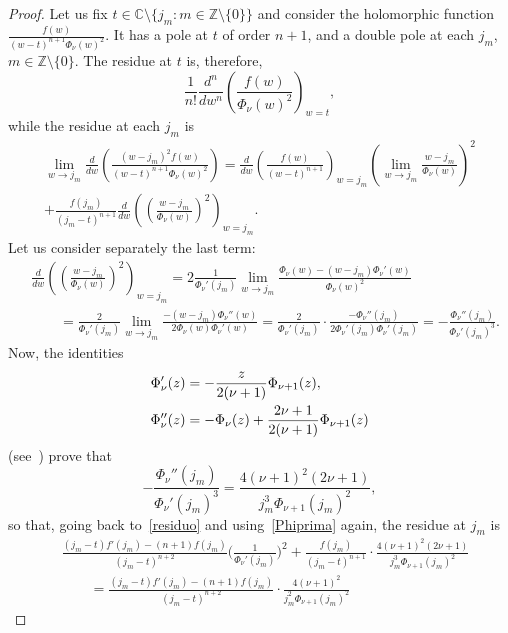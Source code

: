 \documentclass[10pt,leqno,a4paper]{article}
\theoremstyle{plain}
\newcommand{\ZZ}{\mathbb{Z}}
\newcommand{\CC}{\mathbb{C}}
\numberwithin{equation}{section}
\begin{document}
\begin{proof}
Let us fix $t \in \CC \setminus \{j_m : m \in \ZZ \setminus \{0\} \}$ and consider the holomorphic function $\frac{f(w)}{(w-t)^{n+1} \Phi_\nu(w)^2}$. It has a pole at $t$ of order $n+1$, and a double pole at each $j_m$, $m\in \ZZ \setminus \{0\}$. The residue at $t$ is, therefore,
\[
   \frac{1}{n!} \frac{d^n}{dw^n} \left( \frac{f(w)}{\Phi_\nu(w)^2} \right)_{w=t},
\]
while the residue at each $j_m$ is
\begin{multline}
\label{residuo}
   \lim_{w\to j_m} \frac{d}{dw} \left( \frac{(w-j_m)^2 f(w)}{(w-t)^{n+1} \Phi_\nu(w)^2} \right)
   = \frac{d}{dw} \left(\frac{f(w)}{(w-t)^{n+1}}\right)_{w=j_m}
   \left( \lim_{w\to j_m} \frac{w-j_m}{\Phi_\nu(w)} \right)^2
   \\
   + \frac{f(j_m)}{(j_m-t)^{n+1}} \frac{d}{dw} \left(
   \left(\frac{w-j_m}{\Phi_\nu(w)} \right)^2
   \right)_{w=j_m}.
\end{multline}
Let us consider separately the last term:
\begin{align*}
   &\frac{d}{dw}\left(
   \left(\frac{w-j_m}{\Phi_\nu(w)} \right)^2
   \right)_{w=j_m}
   = 2 \frac{1}{\Phi_\nu'(j_m)}
   \lim_{w \to j_m} \frac{\Phi_\nu(w) - (w-j_m) \Phi_\nu'(w)}{\Phi_\nu(w)^2}
   \\
   &\qquad = \frac{2}{\Phi_\nu'(j_m)}
   \lim_{w \to j_m} \frac{-(w-j_m) \Phi_\nu''(w)}{2 \Phi_\nu(w) \Phi_\nu'(w)}
   = \frac{2}{\Phi_\nu'(j_m)} \cdot \frac{-\Phi_\nu''(j_m)}{2\Phi_\nu'(j_m) \Phi_\nu'(j_m)}
   = -\frac{\Phi_\nu''(j_m)}{\Phi_\nu'(j_m)^3}.
\end{align*}
Now, the identities
\begin{align}
\label{Phiprima}
   \Phi_\nu'(z) &= -\frac{z}{2(\nu+1)} \Phi_{\nu+1}(z),
   \\
\notag
   \Phi_\nu''(z) &= - \Phi_\nu(z) + \frac{2\nu+1}{2(\nu+1)} \Phi_{\nu+1}(z)
\end{align}
(see~\cite[\S\,3.2, p.~45]{Wat}) prove that
\[
   -\frac{\Phi_\nu''(j_m)}{\Phi_\nu'(j_m)^3}
   = \frac{4 (\nu+1)^2 (2\nu+1)}{j_m^3 \Phi_{\nu+1}(j_m)^2},
\]
so that, going back to~\eqref{residuo} and using~\eqref{Phiprima} again, the residue at $j_m$ is
\begin{align*}
   &\frac{(j_m - t) f'(j_m) - (n+1) f(j_m)}{(j_m-t)^{n+2}}
   \Big( \frac{1}{\Phi_\nu'(j_m)} \Big)^2
   + \frac{f(j_m)}{(j_m-t)^{n+1}}
   \cdot \frac{4 (\nu+1)^2 (2\nu+1)}{j_m^3 \Phi_{\nu+1}(j_m)^2}
   \\
   &\qquad= \frac{(j_m - t) f'(j_m) - (n+1) f(j_m)}{(j_m-t)^{n+2}}
   \cdot \frac{4(\nu+1)^2}{j_m^2 \Phi_{\nu+1}(j_m)^2}

\end{align*}
\end{proof}
\end{document}
